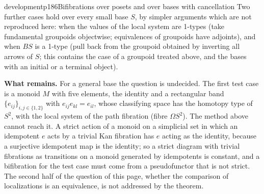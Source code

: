 \begin{dcomment}{development}{p186}{Bifibrations over posets and over bases with cancellation}
Two further cases hold over every small base $S$, by simpler arguments which are not reproduced here: when the values of the local system are 1-types (take fundamental groupoids objectwise; equivalences of groupoids have adjoints), and when $BS$ is a 1-type (pull back from the groupoid obtained by inverting all arrows of $S$; this contains the case of a groupoid treated above, and the bases with an initial or a terminal object).

\textbf{What remains.}
For a general base the question is undecided. The first test case is a monoid $M$ with five elements, the identity and a rectangular band $\{e_{ij}\}_{i,j\in\{1,2\}}$ with $e_{ij}e_{kl}=e_{il}$, whose classifying space has the homotopy type of $S^2$, with the local system of the path fibration (fibre $\Omega S^2$). The method above cannot reach it. A strict action of a monoid on a simplicial set in which an idempotent $e$ acts by a trivial Kan fibration has $e$ acting as the identity, because a surjective idempotent map is the identity; so a strict diagram with trivial fibrations as transitions on a monoid generated by idempotents is constant, and a bifibration for the test case must come from a pseudofunctor that is not strict. The second half of the question of this page, whether the comparison of localizations is an equivalence, is not addressed by the theorem.
\end{dcomment}

